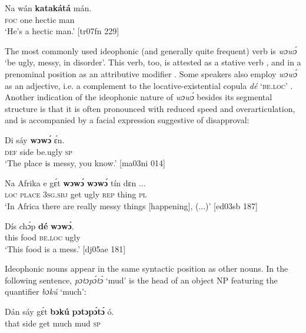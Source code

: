 \ea%
    \label{ex:key:1625}
    \gll Na  wán    \textbf{katakátá}  mán.\\
\textsc{foc}  one    hectic    man\\

\glt ‘He’s a hectic man.’ [tr07fn 229]
\z

The most commonly used ideophonic (and generally quite frequent) verb is \textit{wɔwɔ́} ‘be ugly, messy, in disorder’. This verb, too, is attested as a stative verb , and in a prenominal position as an attributive modifier . Some speakers also employ \textit{wɔwɔ́} as an adjective, i.e. a complement to the locative-existential copula \textit{dé} \textsc{‘be.loc’} . Another indication of the ideophonic nature of \textit{wɔwɔ́} besides its segmental structure is that it is often pronounced with reduced speed and overarticulation, and is accompanied by a facial expression suggestive of disapproval:


\ea%
    \label{ex:key:1626}
    \gll Di  sáy  \textbf{wɔwɔ́}  ɛ́n.\\
\textsc{def}  side  be.ugly  \textsc{sp}\\

\glt ‘The place is messy, you know.’ [ma03ni 014]
\z


\ea%
    \label{ex:key:1627}
    \gll Na  Afrika  e    gɛ́t  \textbf{wɔwɔ́}  \textbf{wɔwɔ́}  tín    dɛn  \op...\cp{}\\
\textsc{loc}  \textsc{place}  \textsc{3sg.sbj}  get  ugly    \textsc{rep}    thing  \textsc{pl}  \\

\glt ‘In Africa there are really messy things [happening], (...)’ [ed03sb 187]
\z


\ea%
    \label{ex:key:1628}
    \gll Dís  chɔ́p  \textbf{dé}    \textbf{wɔwɔ́}.\\
this  food    \textsc{be.loc}  ugly\\

\glt ‘This food is a mess.’ [dj05ae 181]
\z

Ideophonic nouns appear in the same syntactic position as other nouns. In the following sentence, \textit{pɔtɔpɔ́tɔ́} ‘mud’ is the head of an object NP featuring the quantifier \textit{bɔkú} ‘much’:


\ea%
    \label{ex:key:1629}
    \gll Dán  sáy  gɛ́t  \textbf{bɔkú}  \textbf{pɔtɔpɔ́tɔ́}    ó.\\
that  side  get  much  mud      \textsc{sp}\\

